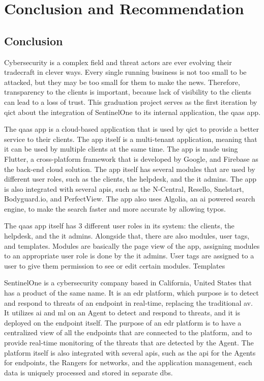 \chapter{Conclusion and Recommendation}

\begin{multicols}{2}
  \section{Conclusion}
  Cybersecurity is a complex field and threat actors are ever evolving their tradecraft in clever ways. Every single
  running business is not too small to be attacked, but they may be too small for them to make the news. Therefore, transparency
  to the clients is important, because lack of visibility to the clients can lead to a loss of trust. This graduation project serves
  as the first iteration by \acrshort{qict} about the integration of SentinelOne to its internal application, the \acrshort{qaas} app.

  The \acrshort{qaas} app is a cloud-based application that is used by \acrshort{qict} to provide a better service to their clients.
  The app itself is a multi-tenant application, meaning that it can be used by multiple clients at the same time. The app is made
  using Flutter, a cross-platform framework that is developed by Google, and Firebase as the back-end cloud solution. The app itself
  has several modules that are used by different user roles, such as the clients, the helpdesk, and the \acrshort{it} admins. The app
  is also integrated with several \acrshort{api}s, such as the N-Central, Resello, Snelstart, Bodyguard.io, and PerfectView. The app
  also uses Algolia, an \acrshort{ai} powered search engine, to make the search faster and more accurate by allowing typos.

  The \acrshort{qaas} app itself has 3 different user roles in its system: the clients, the helpdesk, and the \acrshort{it} admins.
  Alongside that, there are also modules, user tags, and templates. Modules are basically the page view of the app, assigning modules
  to an appropriate user role is done by the \acrshort{it} admins. User tags are assigned to a user to give them permission to see
  or edit certain modules. Templates

  SentinelOne is a cybersecurity company based in California, United States that has a product of the same name. It is an \acrshort{edr}
  platform, which purpose is to detect and respond to threats of an endpoint in real-time, replacing the traditional \acrshort{av}.
  It utilizes \acrshort{ai} and \acrshort{ml} on an Agent to detect and respond to threats, and it is deployed on the endpoint itself.
  The purpose of an \acrshort{edr} platform is to have a centralized view of all the endpoints that are connected to the platform, and
  to provide real-time monitoring of the threats that are detected by the Agent. The platform itself is also integrated with several
  \acrshort{api}s, such as the \acrshort{api} for the Agents for endpoints, the Rangers for networks, and the application management,
  each data is uniquely processed and stored in separate \acrshort{db}s.


\end{multicols}

